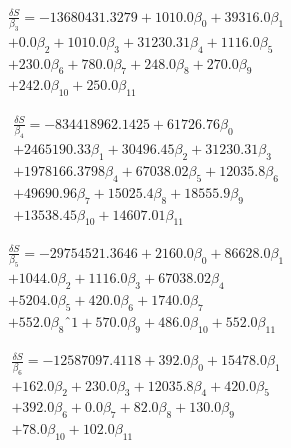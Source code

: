 \documentclass[letterpaper, 10 pt, conference]{ieeeconf}
\begin{document}
\begin{equation}
\begin{split}
\frac{\delta S}{\beta_3} = -13680431.3279+1010.0\beta_0+39316.0\beta_1\\
                        +0.0\beta_2+1010.0\beta_3+31230.31\beta_4+1116.0\beta_5\\
                        +230.0\beta_6+780.0\beta_7+248.0\beta_8+270.0\beta_9\\
                        +242.0\beta_{10}+250.0\beta_{11}
\end{split}
\end{equation}

\begin{equation}
\begin{split}
\frac{\delta S}{\beta_4} = -834418962.1425+61726.76\beta_0\\
                        +2465190.33\beta_1+30496.45\beta_2+31230.31\beta_3\\
                        +1978166.3798\beta_4+67038.02\beta_5+12035.8\beta_6\\
                        +49690.96\beta_7+15025.4\beta_8+18555.9\beta_9\\
                        +13538.45\beta_{10}+14607.01\beta_{11}
\end{split}
\end{equation}

\begin{equation}
\begin{split}
\frac{\delta S}{\beta_5} = -29754521.3646+2160.0\beta_0+86628.0\beta_1\\
                        +1044.0\beta_2+1116.0\beta_3+67038.02\beta_4\\
                        +5204.0\beta_5+420.0\beta_6+1740.0\beta_7\\
                        +552.0\beta_8ˆ1+570.0\beta_9+486.0\beta_{10}+552.0\beta_{11}
\end{split}
\end{equation}

\begin{equation}
\begin{split}
\frac{\delta S}{\beta_6} = -12587097.4118+392.0\beta_0+15478.0\beta_1\\
                        +162.0\beta_2+230.0\beta_3+12035.8\beta_4+420.0\beta_5\\
                        +392.0\beta_6+0.0\beta_7+82.0\beta_8+130.0\beta_9\\
                        +78.0\beta_{10}+102.0\beta_{11}
\end{split}
\end{equation}
\end{document}
